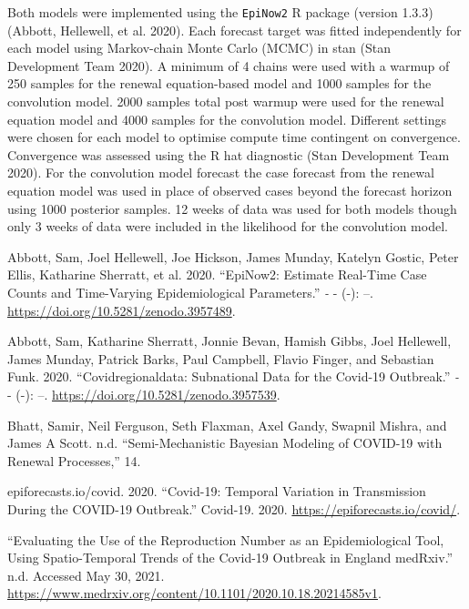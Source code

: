Both models were implemented using the \texttt{EpiNow2} R package (version 1.3.3) (Abbott, Hellewell, et al. 2020). Each forecast target was fitted independently for each model using Markov-chain Monte Carlo (MCMC) in stan (Stan Development Team 2020). A minimum of 4 chains were used with a warmup of 250 samples for the renewal equation-based model and 1000 samples for the convolution model. 2000 samples total post warmup were used for the renewal equation model and 4000 samples for the convolution model. Different settings were chosen for each model to optimise compute time contingent on convergence. Convergence was assessed using the R hat diagnostic (Stan Development Team 2020). For the convolution model forecast the case forecast from the renewal equation model was used in place of observed cases beyond the forecast horizon using 1000 posterior samples. 12 weeks of data was used for both models though only 3 weeks of data were included in the likelihood for the convolution model.

\clearpage

\hypertarget{refs}{}
\leavevmode{}%
Abbott, Sam, Joel Hellewell, Joe Hickson, James Munday, Katelyn Gostic, Peter Ellis, Katharine Sherratt, et al. 2020. {``EpiNow2: Estimate Real-Time Case Counts and Time-Varying Epidemiological Parameters.''} \emph{-} - (-): --. \url{https://doi.org/10.5281/zenodo.3957489}.

\leavevmode{}%
Abbott, Sam, Katharine Sherratt, Jonnie Bevan, Hamish Gibbs, Joel Hellewell, James Munday, Patrick Barks, Paul Campbell, Flavio Finger, and Sebastian Funk. 2020. {``Covidregionaldata: Subnational Data for the Covid-19 Outbreak.''} \emph{-} - (-): --. \url{https://doi.org/10.5281/zenodo.3957539}.

\leavevmode{}%
Bhatt, Samir, Neil Ferguson, Seth Flaxman, Axel Gandy, Swapnil Mishra, and James A Scott. n.d. {``Semi-{Mechanistic Bayesian} Modeling of {COVID-19} with {Renewal Processes},''} 14.

\leavevmode{}%
epiforecasts.io/covid. 2020. {``Covid-19: {Temporal} Variation in Transmission During the {COVID-19} Outbreak.''} {Covid-19}. 2020. \url{https://epiforecasts.io/covid/}.

\leavevmode{}%
{``Evaluating the Use of the Reproduction Number as an Epidemiological Tool, Using Spatio-Temporal Trends of the {Covid-19} Outbreak in {England} \textbar{} {medRxiv}.''} n.d. Accessed May 30, 2021. \url{https://www.medrxiv.org/content/10.1101/2020.10.18.20214585v1}.

